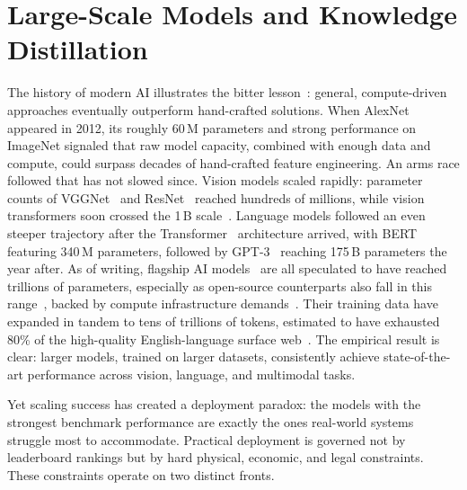 \section{Large-Scale Models and Knowledge Distillation} \label{sec:11-introduction-largescale}
\begin{foldable}
  The history of modern \ac{AI} illustrates the bitter lesson~\cite{sutton2019bitter}: general, compute-driven approaches eventually outperform hand-crafted solutions.
  When AlexNet~\cite{krizhevsky2012imagenet} appeared in 2012, its roughly 60\,M parameters and strong performance on ImageNet signaled that raw model capacity, combined with enough data and compute, could surpass decades of hand-crafted feature engineering.
  An arms race followed that has not slowed since.
  Vision models scaled rapidly: parameter counts of VGGNet~\cite{simonyan2014very} and ResNet~\cite{he2016deep} reached hundreds of millions, while vision transformers soon crossed the 1\,B scale~\cite{dosovitskiy2020image,zhai2022scaling}.
  Language models followed an even steeper trajectory after the Transformer~\cite{vaswani2017attention} architecture arrived, with BERT~\cite{devlin2019bert} featuring 340\,M parameters, followed by GPT-3~\cite{brown2020language} reaching 175\,B parameters the year after.
  As of writing, flagship \ac{AI} models~\cite{anthropic2026assessing,openai2025introducing} are all speculated to have reached trillions of parameters, especially as open-source counterparts also fall in this range~\cite{meta2025llama4,yang2025qwen3}, backed by compute infrastructure demands~\cite{elmeleegy2024demystifying}.
  Their training data have expanded in tandem to tens of trillions of tokens, estimated to have exhausted 80\% of the high-quality English-language surface web~\cite{villalobos2024position}.
  The empirical result is clear: larger models, trained on larger datasets, consistently achieve state-of-the-art performance across vision, language, and multimodal tasks.
\end{foldable}

\begin{foldable}
  Yet scaling success has created a deployment paradox: the models with the strongest benchmark performance are exactly the ones real-world systems struggle most to accommodate.
  Practical deployment is governed not by leaderboard rankings but by hard physical, economic, and legal constraints.
  These constraints operate on two distinct fronts.
\end{foldable}

